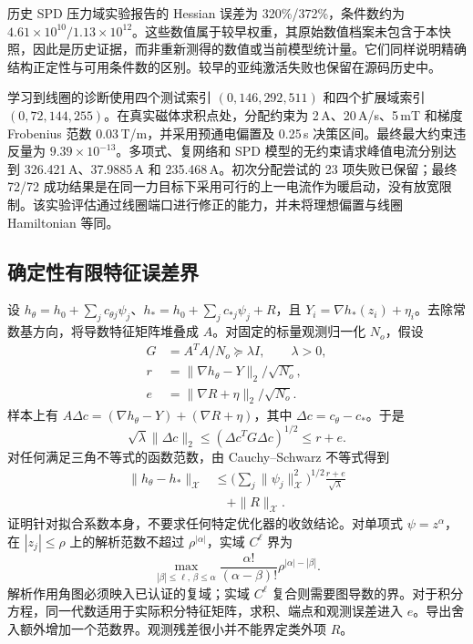 历史 SPD 压力域实验报告的 Hessian 误差为 320\%/372\%，条件数约为 $4.61\times10^{10}/1.13\times10^{12}$。这些数值属于较早权重，其原始数值档案未包含于本快照，因此是历史证据，而非重新测得的数值或当前模型统计量。它们同样说明精确结构正定性与可用条件数的区别。较早的亚纯激活失败也保留在源码历史中。

学习到线圈的诊断使用四个测试索引 $(0,146,292,511)$ 和四个扩展域索引 $(0,72,144,255)$。在真实磁体求积点处，分配约束为 2\,A、20\,A/s、5\,mT 和梯度 Frobenius 范数 0.03\,T/m，并采用预通电偏置及 0.25\,s 决策区间。最终最大约束违反量为 $9.39\times10^{-13}$。多项式、复网络和 SPD 模型的无约束请求峰值电流分别达到 326.421\,A、37.9885\,A 和 235.468\,A。初次分配尝试的 23 项失败已保留；最终 72/72 成功结果是在同一力目标下采用可行的上一电流作为暖启动，没有放宽限制。该实验评估通过线圈端口进行修正的能力，并未将理想偏置与线圈 Hamiltonian 等同。

\subsection{确定性有限特征误差界}
设 $h_\theta=h_0+\sum_jc_{\theta j}\psi_j$、$h_*=h_0+\sum_jc_{*j}\psi_j+R$，且 $Y_i=\nabla h_*(z_i)+\eta_i$。去除常数基方向，将导数特征矩阵堆叠成 $A$。对固定的标量观测归一化 $N_o$，假设
\begin{equation}
 \begin{aligned}
 G&=A^TA/N_o\succeq\lambda I,\qquad\lambda>0,\\
 r&=\|\nabla h_\theta-Y\|_2/\sqrt{N_o},\\
 e&=\|\nabla R+\eta\|_2/\sqrt{N_o}.
 \end{aligned}
 \label{eq:supp-learn-gram-definitions}
\end{equation}
样本上有 $A\Delta c=(\nabla h_\theta-Y)+(\nabla R+\eta)$，其中 $\Delta c=c_\theta-c_*$。于是
\begin{equation}
 \sqrt\lambda\|\Delta c\|_2
 \le(\Delta c^TG\Delta c)^{1/2}\le r+e.
 \label{eq:supp-learn-coefficient-proof}
\end{equation}
对任何满足三角不等式的函数范数，由 Cauchy--Schwarz 不等式得到
\begin{equation}
 \begin{aligned}
 \|h_\theta-h_*\|_{\mathcal X}
 &\le\Big(\sum_j\|\psi_j\|_{\mathcal X}^2\Big)^{1/2}
       \frac{r+e}{\sqrt\lambda}\\
 &\quad+\|R\|_{\mathcal X}.
 \end{aligned}
 \label{eq:supp-learn-gram-conclusion}
\end{equation}
证明针对拟合系数本身，不要求任何特定优化器的收敛结论。对单项式 $\psi=z^\alpha$，在 $|z_j|\le\rho$ 上的解析范数不超过 $\rho^{|\alpha|}$，实域 $C^\ell$ 界为
\begin{equation}
 \max_{|\beta|\le\ell,\,\beta\le\alpha}
 \frac{\alpha!}{(\alpha-\beta)!}\rho^{|\alpha|-|\beta|}.
 \label{eq:supp-learn-monomial-bound}
\end{equation}
解析作用角图必须映入已认证的复域；实域 $C^\ell$ 复合则需要图导数的界。对于积分方程，同一代数适用于实际积分特征矩阵，求积、端点和观测误差进入 $e$。导出舍入额外增加一个范数界。观测残差很小并不能界定类外项 $R$。

